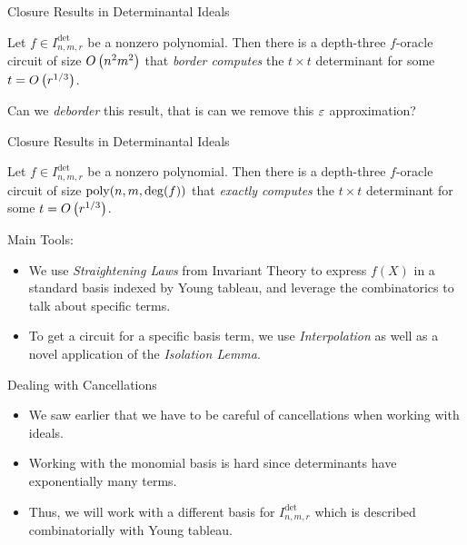 \documentclass[aspectratio=169]{beamer}
\begin{document}
\begin{frame}{Closure Results in Determinantal Ideals}    
    \begin{thrm}[{\cite[Theorem 1.1]{AF22}}]
        Let $f \in I^{\det}_{n, m, r}$ be a nonzero polynomial.
        Then there is a depth-three $f$-oracle circuit of size $O\kern-0.0pt\left(n^2 m^2\right)$ that \emph{border computes} the $t \times t$ determinant for some $t = O\kern-0.0pt\left(r^{1 / 3}\right)$.
    \end{thrm}

    \pause

    \begin{question}
        Can we \emph{deborder} this result, that is can we remove this $\varepsilon$ approximation?
    \end{question}
\end{frame}

\begin{frame}{Closure Results in Determinantal Ideals}
    \begin{thrm}[{\cite[Theorem 1.5]{DG25}}]
        Let $f \in I^{\det}_{n, m, r}$ be a nonzero polynomial.
        Then there is a depth-three $f$-oracle circuit of size $\operatorname{poly}(n, m, \deg(f))$ that \emph{exactly computes} the $t \times t$ determinant for some $t = O\kern-0.0pt\left(r^{1 / 3}\right)$.
    \end{thrm}

    \pause

    Main Tools:
    \begin{itemize}
        \item We use \emph{Straightening Laws} from Invariant Theory to express $f(X)$ in a standard basis indexed by Young tableau\pause, and leverage the combinatorics to talk about specific terms.\pause
        \item To get a circuit for a specific basis term, we use \emph{Interpolation} as well as a novel application of the \emph{Isolation Lemma}.
    \end{itemize}
\end{frame}


\begin{frame}{Dealing with Cancellations}

  \pause

  \begin{itemize}
  \item We saw earlier that we have to be careful of cancellations when working with ideals.\ \pause
  \item Working with the monomial basis is hard since determinants have exponentially many terms.\ \pause
  \item Thus, we will work with a different basis for $I^{\det}_{n, m, r}$ which is described combinatorially with Young tableau.
  \end{itemize}
\end{frame}
\end{document}
